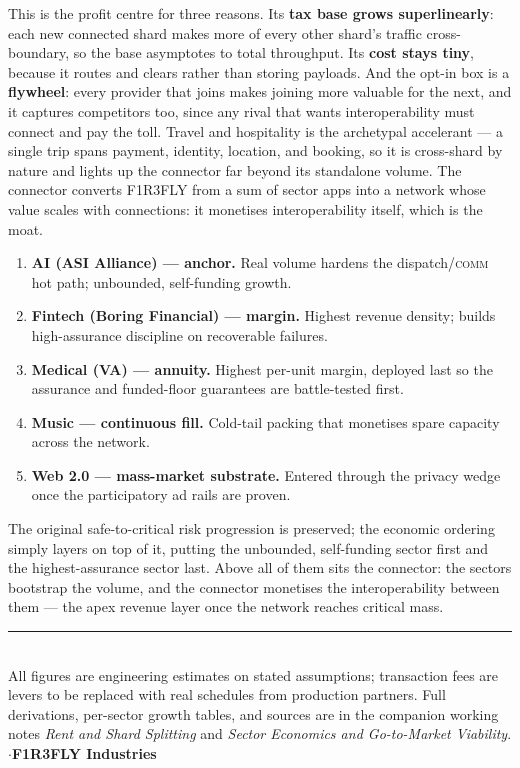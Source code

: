 \documentclass[11pt]{article}
\begin{document}
This is the profit centre for three reasons. Its \textbf{tax base grows superlinearly}: each new connected shard makes more of every other shard's traffic cross-boundary, so the base asymptotes to total throughput. Its \textbf{cost stays tiny}, because it routes and clears rather than storing payloads. And the opt-in box is a \textbf{flywheel}: every provider that joins makes joining more valuable for the next, and it captures competitors too, since any rival that wants interoperability must connect and pay the toll. Travel and hospitality is the archetypal accelerant --- a single trip spans payment, identity, location, and booking, so it is cross-shard by nature and lights up the connector far beyond its standalone volume. The connector converts F1R3FLY from a sum of sector apps into a network whose value scales with connections: it monetises interoperability itself, which is the moat.



\begin{enumerate}[leftmargin=1.6em, itemsep=3pt]
  \item \textbf{AI (ASI Alliance) --- anchor.} Real volume hardens the dispatch/\textsc{comm} hot path; unbounded, self-funding growth.
  \item \textbf{Fintech (Boring Financial) --- margin.} Highest revenue density; builds high-assurance discipline on recoverable failures.
  \item \textbf{Medical (VA) --- annuity.} Highest per-unit margin, deployed last so the assurance and funded-floor guarantees are battle-tested first.
  \item \textbf{Music --- continuous fill.} Cold-tail packing that monetises spare capacity across the network.
  \item \textbf{Web 2.0 --- mass-market substrate.} Entered through the privacy wedge once the participatory ad rails are proven.
\end{enumerate}

The original safe-to-critical risk progression is preserved; the economic ordering simply layers on top of it, putting the unbounded, self-funding sector first and the highest-assurance sector last. Above all of them sits the connector: the sectors bootstrap the volume, and the connector monetises the interoperability between them --- the apex revenue layer once the network reaches critical mass.

\vspace{8pt}
{\color{f1r3red}\rule{\textwidth}{1.5pt}}\\[2pt]
{\color{f1r3ash}\footnotesize All figures are engineering estimates on stated assumptions; transaction fees are levers to be replaced with real schedules from production partners. Full derivations, per-sector growth tables, and sources are in the companion working notes \emph{Rent and Shard Splitting} and \emph{Sector Economics and Go-to-Market Viability}. \quad$\cdot$\quad \textbf{F1R3FLY Industries}}
\end{document}
